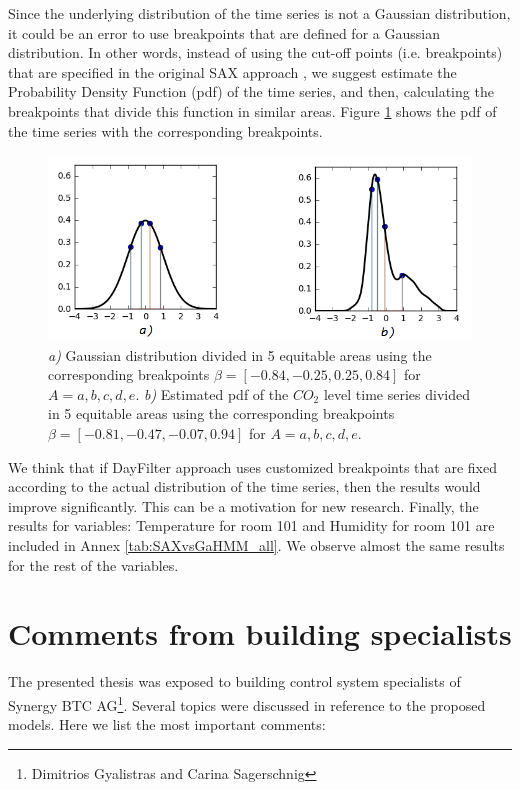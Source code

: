 Since the underlying distribution of the time series is not a Gaussian distribution, it could be an error to use breakpoints that are defined for a Gaussian distribution. In other words, instead of using the cut-off points (i.e. breakpoints) that are specified in the original SAX approach \cite{lin2003symbolic, keogh2005hot, lin2007experiencing}, we suggest estimate the Probability Density Function (pdf) of the time series, and then, calculating the breakpoints that divide this function in similar areas. Figure \ref{fig:pdf_estimated} shows the pdf of the time series with the corresponding breakpoints.         


\begin{figure}[h!]
  \vspace{0.5em} %
  \includegraphics[scale=0.7]{Figures/pdf_estimated.jpg}
  \caption{ \textit{a)} Gaussian distribution divided in 5 equitable areas using the corresponding breakpoints $\beta = [-0.84, -0.25, 0.25, 0.84]$ for $A={a,b,c,d,e}$. \textit{ b)} Estimated pdf of the $CO_2$ level time series divided in 5 equitable areas using the corresponding breakpoints $\beta = [-0.81, -0.47, -0.07, 0.94]$ for $A={a,b,c,d,e}$.}
  \label{fig:pdf_estimated}
\end{figure} 

We think that if DayFilter approach uses customized breakpoints that are fixed according to the actual distribution of the time series, then the results would improve significantly. This can be a motivation for new research. Finally, the results for variables: Temperature for room 101 and Humidity for room 101 are included in Annex \ref{tab:SAXvsGaHMM_all}. We observe almost the same results for the rest of the variables.     

\section{Comments from building specialists}
\label{comments}
The presented thesis was exposed to building control system specialists of Synergy BTC AG\footnote{Dimitrios Gyalistras and Carina Sagerschnig}. Several topics were discussed in reference to the proposed models. Here we list the most important comments:

